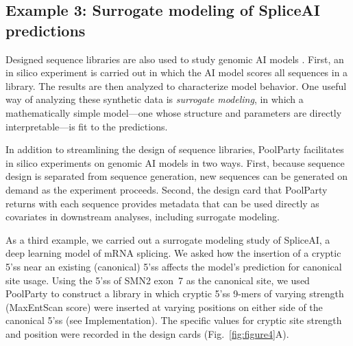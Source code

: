 \documentclass[pdflatex,sn-vancouver-num,referee,oneside]{sn-jnl}
\newif\ifshowquoted
\newcommand{\quoted}[1]{\ifshowquoted\textcolor{quotedtext}{#1}\else#1\fi}
\begin{document}
\subsection*{Example 3: Surrogate modeling of SpliceAI predictions}\label{subsec:example3-spliceai}

Designed sequence libraries are also used to study genomic AI models \citep{Avsec2021bpnet, Toneyan2024creme, Seitz2024squid, Nagai2026review}. First, an in silico experiment is carried out in which the AI model scores all sequences in a library. The results are then analyzed to characterize model behavior. One useful way of analyzing these synthetic data is \emph{surrogate modeling}, in which a mathematically simple model---one whose structure and parameters are directly interpretable---is fit to the predictions.

In addition to streamlining the design of sequence libraries, PoolParty facilitates in silico experiments on genomic AI models in two ways. First, because sequence design is separated from sequence generation, new sequences can be generated on demand as the experiment proceeds. Second, the design card that PoolParty returns with each sequence provides metadata that can be used directly as covariates in downstream analyses, including surrogate modeling.

As a third example, we carried out a surrogate modeling study of SpliceAI, a deep learning model of mRNA splicing. We asked how the insertion of a cryptic 5'ss near an existing (canonical) 5'ss affects the model's prediction for canonical site usage. \quoted{Using the 5'ss of SMN2 exon~7 as the canonical site, we used PoolParty to construct a library in which cryptic 5'ss 9-mers of varying strength (MaxEntScan score) were inserted at varying positions on either side of the canonical 5'ss (see Implementation).} The specific values for cryptic site strength and position were recorded in the design cards (Fig.~\ref{fig:figure4}A).
\end{document}
